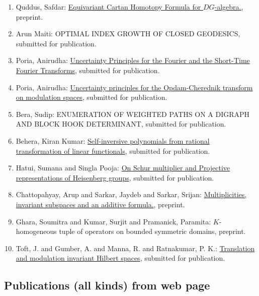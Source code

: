 \begin{enumerate}
\item Quddus, Safdar: \href{https://arxiv.org/abs/2002.02192}{Equivariant Cartan Homotopy Formula for $DG$-algebra.}, preprint.
\item Arun Maiti: OPTIMAL INDEX GROWTH OF CLOSED GEODESICS, submitted for publication.
\item Poria, Anirudha: \href{https://arxiv.org/abs/2004.04184}{Uncertainty Principles for the Fourier and the Short-Time Fourier Transforms}, submitted for publication.
\item Poria, Anirudha: \href{https://arxiv.org/abs/2005.14274}{Uncertainty principles for the Opdam-Cherednik transform on modulation spaces}, submitted for publication.
\item Bera, Sudip: ENUMERATION OF WEIGHTED PATHS ON A DIGRAPH AND BLOCK HOOK DETERMINANT, submitted for publication.
\item Behera, Kiran Kumar: \href{https://arxiv.org/abs/1909.12548}{Self-inversive polynomials from rational transformation of linear functionals}, submitted for publication.
\item Hatui, Sumana and Singla Pooja: \href{https://arxiv.org/abs/1909.06589}{On Schur multiplier and Projective representations of Heisenberg groups}, submitted for publication.
\item Chattopahyay, Arup and Sarkar, Jaydeb and Sarkar, Srijan: \href{https://arxiv.org/abs/1812.05435}{Multiplicities, invariant subspaces and an additive formula.}, preprint.
\item Ghara, Soumitra and Kumar, Surjit and Pramanick, Paramita: $K$-homogeneous tuple of operators on bounded symmetric domains, preprint.
\item Toft, J. and Gumber, A. and Manna, R. and Ratnakumar, P. K.: \href{https://arxiv.org/abs/2004.02430v1}{Translation and modulation invariant Hilbert spaces}, submitted for publication.
\end{enumerate}



\subsection{Publications (all kinds) from web page}


